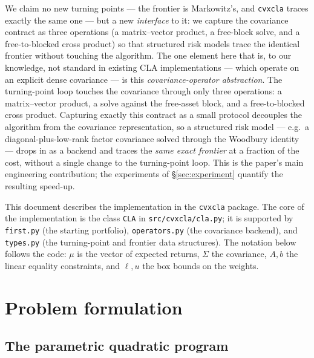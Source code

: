 \documentclass[11pt]{article}
\newcommand{\Sig}{\Sigma}
\newcommand{\lb}{\ell}              %
\newcommand{\ub}{u}                 %
\begin{document}
We claim no new turning points --- the frontier is Markowitz's, and \texttt{cvxcla}
traces exactly the same one --- but a new \emph{interface} to it: we capture the
covariance contract as three operations (a matrix--vector product, a free-block
solve, and a free-to-blocked cross product) so that structured risk models trace
the identical frontier without touching the algorithm. The one element here that
is, to our knowledge, not standard in existing CLA
implementations --- which operate on an explicit dense covariance
\citep{markowitz2000, bailey2013} --- is this \emph{covariance-operator
abstraction}. The turning-point loop touches the covariance through only three
operations: a matrix--vector product, a solve against the free-asset block, and a
free-to-blocked cross product. Capturing exactly this contract as a small
protocol decouples the algorithm from the covariance representation, so a
structured risk model --- e.g.\ a diagonal-plus-low-rank factor covariance solved
through the Woodbury identity --- drops in as a backend and traces the
\emph{same exact frontier} at a fraction of the cost, without a single change to
the turning-point loop. This is the paper's main engineering contribution; the
experiments of \S\ref{sec:experiment} quantify the resulting speed-up.

This document describes the implementation in the \texttt{cvxcla} package. The core of
the implementation is the class \texttt{CLA} in \texttt{src/cvxcla/cla.py}; it is
supported by \texttt{first.py} (the starting portfolio), \texttt{operators.py} (the
covariance backend), and \texttt{types.py} (the turning-point and frontier data
structures). The notation below follows the code: $\mu$ is the vector of expected
returns, $\Sig$ the covariance, $A,b$ the linear equality constraints, and $\lb,\ub$ the
box bounds on the weights.

\section{Problem formulation}

\subsection{The parametric quadratic program}
\end{document}
